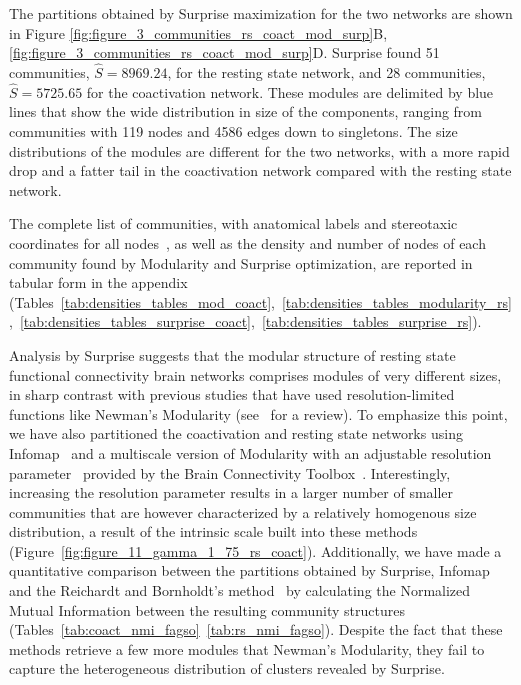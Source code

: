 The partitions obtained by Surprise maximization for the two networks are shown in Figure \ref{fig:figure_3_communities_rs_coact_mod_surp}B, \ref{fig:figure_3_communities_rs_coact_mod_surp}D. Surprise found 51 communities, $\hat{S}=8969.24$, for the resting state network, and 28 communities, $\hat{S}=5725.65$ for the coactivation network.
These modules are delimited by blue lines that show the wide distribution in size of the components, ranging from communities with 119 nodes and 4586 edges down to singletons.
The size distributions of the modules are different for the two networks, with a more rapid drop and a fatter tail in the coactivation network compared with the resting state network.

The complete list of communities, with anatomical labels and stereotaxic coordinates for all nodes~\cite{laird2010,lancaster2007,tzourio2002}, as well as the density and number of nodes of each community found by Modularity and Surprise optimization, are reported in tabular form in the appendix (Tables~\ref{tab:densities_tables_mod_coact},~\ref{tab:densities_tables_modularity_rs},~\ref{tab:densities_tables_surprise_coact},~\ref{tab:densities_tables_surprise_rs}).

Analysis by Surprise suggests that the modular structure of resting state functional connectivity brain networks comprises modules of very different sizes, in sharp contrast with previous studies that have used resolution-limited functions like Newman's Modularity (see~\cite{meunier2010} for a review).
To emphasize this point, we have also partitioned the coactivation and resting state networks using Infomap~\cite{rosvall2008} and a multiscale version of Modularity with an adjustable resolution parameter~\cite{reichardt2006} provided by the Brain Connectivity Toolbox~\cite{rubinov2010}.
Interestingly, increasing the resolution parameter results in a larger number of smaller communities that are however characterized by a relatively homogenous size distribution, a result of the intrinsic scale built into these methods (Figure~\ref{fig:figure_11_gamma_1_75_rs_coact}).
Additionally, we have made a quantitative comparison between the partitions obtained by Surprise, Infomap and the Reichardt and Bornholdt's method~\cite{reichardt2006} by calculating the Normalized Mutual Information between the resulting community structures (Tables~\ref{tab:coact_nmi_fagso}~\ref{tab:rs_nmi_fagso}). Despite the fact that these methods retrieve a few more modules that Newman's Modularity, they fail to capture the heterogeneous distribution of clusters revealed by Surprise. 


